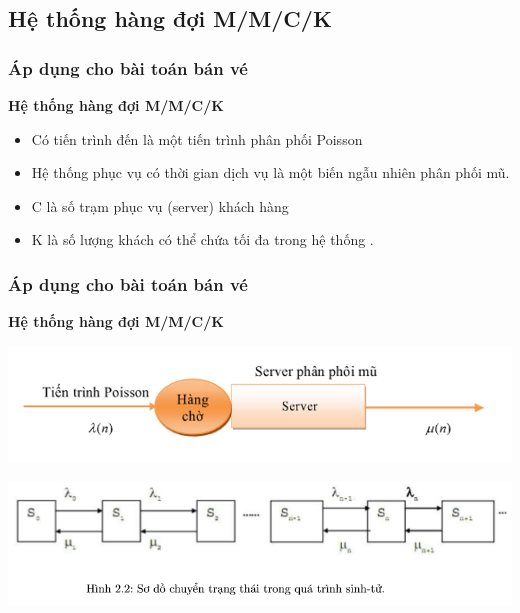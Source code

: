 \documentclass[10pt]{beamer}
\begin{document}
\subsection{Hệ thống hàng đợi M/M/C/K}
\begin{frame}
	\frametitle{Áp dụng cho bài toán bán vé}
	\begin{block}{\textbf{Hệ thống hàng đợi M/M/C/K}}
\begin{itemize}
    \item Có tiến trình đến là một tiến trình phân phối Poisson
    \item Hệ thống phục vụ có thời gian dịch vụ là một biến ngẫu nhiên phân phối mũ.
    \item C là số trạm phục vụ (server) khách hàng
    \item K là số lượng khách có thể chứa tối đa trong hệ thống .
\end{itemize}	
\end{block}
\end{frame}
\begin{frame}
\frametitle{Áp dụng cho bài toán bán vé}
\begin{block}{\textbf{Hệ thống hàng đợi M/M/C/K}}
	\begin{center}
		\includegraphics[scale=.8]{img/HT_MMCK.PNG}
	\end{center}
	\begin{center}
		\includegraphics[scale=.8]{img/QT_SinhTu.PNG}
	\end{center}
\end{block}
		
\end{frame}
\end{document}
